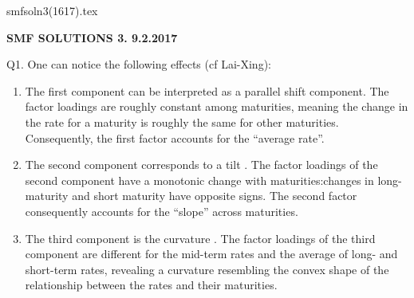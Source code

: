 \documentclass[12pt]{article}
\begin{document}
\def\ni{\noindent}
\def\i{\indent}
\def\a{\alpha}
\def\b{\beta}
\def\e{\epsilon}
\def\d{\delta}
\def\g{\gamma}
\def\qq{\qquad}
\def\L{\Lambda}
\def\C{\cal C}
\def\E{\cal E}
\def\G{\Gamma}
\def\F{\cal F}
\def\K{\cal K}
\def\O{\cal O}
\def\A{\cal A}
\def\B{\cal B}
\def\S{\cal S}
\def\N{\cal N}
\def\M{\cal M}
\def\P{\cal P}
\def\Om{\Omega}
\def\om{\omega}
\def\s{\sigma}
\def\t{\theta}
\def\z{\zeta}
\def\p{\phi}
\def\m{\mu}
\def\n{\nu}
\def\b{\beta}
\def\e{\epsilon}
\def\l{\lambda}
\def\Si{\Sigma}
\def\half{\frac{1}{2}}
\def\hb{\hfil \break}
\ni smfsoln3(1617).tex \\
\begin{center}
{\bf SMF SOLUTIONS 3. 9.2.2017} \\
\end{center}

\ni Q1.   One can notice the following effects (cf Lai-Xing):
\begin{enumerate}
\item The first component can be interpreted as a parallel  shift  component. The factor loadings are roughly constant among maturities, meaning the change in the rate for a maturity is roughly the same for other maturities.  Consequently,  the first
factor accounts for the ``average rate''.
\item The  second  component  corresponds  to  a
tilt
.   The  factor  loadings  of  the  second
component have a monotonic change with maturities:changes in long-maturity and
short maturity have opposite signs.  The second factor consequently accounts for
the ``slope'' across maturities.
\item The third component is the
curvature
.  The factor loadings of the third component
are different for the mid-term rates and the average of long- and short-term rates,
revealing a curvature resembling the convex shape of the relationship between the
rates and their maturities.
\end{enumerate}
\end{document}

